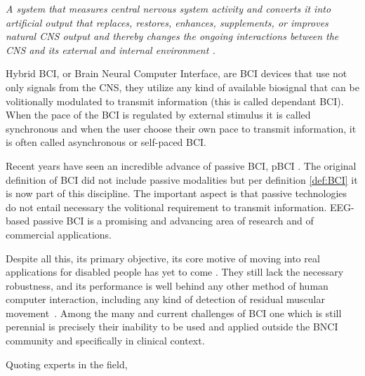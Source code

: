 \vspace{10px}

\begin{story}
\theoremstyle{definition}
\begin{definition}{}
\label{def:BCI}
\textit{A system that measures central nervous system activity and converts it into artificial output that replaces, restores, enhances, supplements, or improves natural CNS output and thereby changes the ongoing interactions between the CNS and its external and internal environment \cite{WolpawJonathanR2012}.}
\end{definition}
\end{story}

Hybrid BCI, or Brain Neural Computer Interface, are BCI devices that use not only signals from the CNS, they utilize any kind of available biosignal that can be volitionally modulated to transmit information (this is called dependant BCI).  When the pace of the BCI is regulated by external stimulus it is called synchronous and when the user choose their own pace to transmit information, it is often called asynchronous or self-paced BCI.

Recent years have seen an incredible advance of passive BCI, pBCI \cite{Zander2010}.  The original definition of BCI did not include passive modalities but per definition \ref{def:BCI} it is now part of this discipline.  The important aspect is that passive technologies do not entail necessary the volitional requirement to transmit information.  EEG-based passive BCI is a promising and advancing area of research and of commercial applications.

Despite all this, its primary objective, its core motive of moving into real applications for disabled people has yet to come \cite{Brunner2014,Jeunet2014,Allison2013}. They still lack the necessary robustness, and its performance is well behind any other method of human computer interaction, including any kind of detection of residual muscular movement~\cite{Clerc2016}. Among the many and current challenges of BCI \cite{Brunner2014} one which is still perennial is precisely their inability to be used and applied outside the BNCI community and specifically in clinical context.  

Quoting experts in the field,

